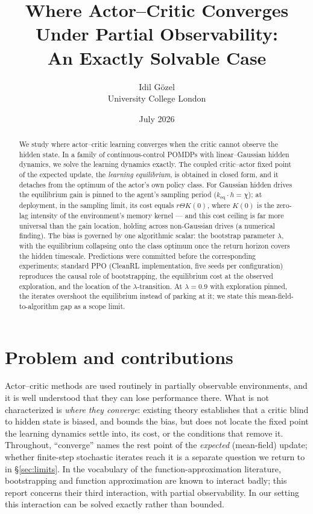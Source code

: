 \documentclass[11pt]{article}
\title{\bfseries Where Actor--Critic Converges Under Partial Observability:\\An Exactly Solvable Case}
\author{Idil G\"ozel\\ \normalsize University College London}
\date{July 2026}
\newcommand{\keq}{k_{\mathrm{eq}}}
\begin{document}
\maketitle

\begin{abstract}
\noindent We study where actor--critic learning converges when the critic cannot observe the
hidden state. In a family of continuous-control POMDPs with linear--Gaussian hidden dynamics,
we solve the learning dynamics exactly. The coupled critic--actor fixed point of the
expected update, the \emph{learning equilibrium}, is obtained in closed form, and it detaches
from the optimum of the actor's own policy class. For Gaussian hidden drives the equilibrium
gain is pinned to the agent's sampling period ($\keq \cdot h = \chi$); at deployment, in the
sampling limit, its cost equals $r\Theta K(0)$, where $K(0)$ is the zero-lag intensity of the
environment's memory kernel --- and this cost ceiling is far more universal than the gain
location, holding across non-Gaussian drives (a numerical finding). The bias is governed by one
algorithmic scalar: the bootstrap parameter $\lambda$, with the equilibrium collapsing onto the
class optimum once the return horizon covers the hidden timescale. Predictions were committed
before the corresponding experiments; standard PPO (CleanRL implementation, five seeds per
configuration) reproduces the causal role of bootstrapping, the equilibrium cost at the observed
exploration, and the location of the $\lambda$-transition. At $\lambda = 0.9$ with exploration
pinned, the iterates overshoot the equilibrium instead of parking at it; we state this
mean-field-to-algorithm gap as a scope limit.
\end{abstract}

\section{Problem and contributions}

Actor--critic methods are used routinely in partially observable environments, and it is well
understood that they can lose performance there. What is not characterized is \emph{where they
converge}: existing theory establishes that a critic blind to hidden state is biased, and
bounds the bias, but does not locate the fixed point the learning dynamics settle into, its
cost, or the conditions that remove it. Throughout, ``converge'' names the rest point of the
\emph{expected} (mean-field) update; whether finite-step stochastic iterates reach it is a
separate question we return to in \S\ref{sec:limits}. In the vocabulary of the
function-approximation literature, bootstrapping and function approximation are known to
interact badly; this report concerns their third interaction, with partial observability. In
our setting this interaction can be solved exactly rather than bounded.
\end{document}
